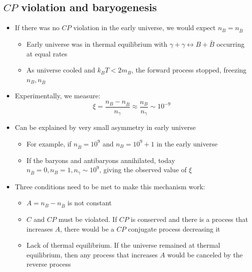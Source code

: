 \documentclass[11pt]{article}
\newcommand{\CP}{\ensuremath{CP}\xspace}
\begin{document}
\subsection{$CP$ violation and baryogenesis}
\begin{itemize}
  \item If there was no \CP violation in the early universe, we would expect $n_B = n_{\bar{B}}$
  \begin{itemize}
    \item Early universe was in thermal equilibrium with $\gamma+\gamma \leftrightarrow B+\bar{B}$ occurring at equal rates
    \item As universe cooled and $k_BT< 2 m_B$, the forward process stopped, freezing $n_B,n_{\bar{B}}$
  \end{itemize}
  \item Experimentally, we measure:
  \begin{equation}
    \xi = \frac{n_B- n_{\bar{B}}}{n_\gamma} \approx \frac{n_B}{n_\gamma} \sim 10^{-9}
  \end{equation}
  \item Can be explained by very small asymmetry in early universe
  \begin{itemize}
    \item For example, if $n_{\bar{B}} = 10^9$ and $n_B = 10^9+1$ in the early universe
    \item If the baryons and antibaryons annihilated, today $n_{\bar{B}} = 0, n_B = 1, n_\gamma \sim 10^9$, giving the observed value of $\xi$
  \end{itemize}
  \item Three conditions need to be met to make this mechanism work:
  \begin{itemize}
    \item $A = n_B - n_{\bar{B}}$ is not constant
    \item $C$ and \CP must be violated. If \CP is conserved and there is a process that increases $A$, there would be a \CP conjugate process decreasing it
    \item Lack of thermal equilibrium. If the universe remained at thermal equilibrium, then any process that increases $A$ would be canceled by the reverse process
  \end{itemize}
\end{itemize}
\end{document}
